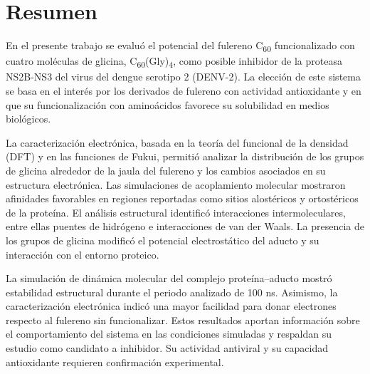 \titleformat{\chapter}[display]
  {\normalfont\bfseries}{}{0pt}{\Large}
\chapter{Resumen}
En el presente trabajo se evaluó el potencial del fulereno C\textsubscript{60} funcionalizado con cuatro moléculas de glicina, C\textsubscript{60}(Gly)\textsubscript{4}, como posible inhibidor de la proteasa NS2B-NS3 del virus del dengue serotipo 2 (DENV-2). La elección de este sistema se basa en el interés por los derivados de fulereno con actividad antioxidante y en que su funcionalización con aminoácidos favorece su solubilidad en medios biológicos.

La caracterización electrónica, basada en la teoría del funcional de la densidad (DFT) y en las funciones de Fukui, permitió analizar la distribución de los grupos de glicina alrededor de la jaula del fulereno y los cambios asociados en su estructura electrónica. Las simulaciones de acoplamiento molecular mostraron afinidades favorables en regiones reportadas como sitios alostéricos y ortostéricos de la proteína. El análisis estructural identificó interacciones intermoleculares, entre ellas puentes de hidrógeno e interacciones de van der Waals. La presencia de los grupos de glicina modificó el potencial electrostático del aducto y su interacción con el entorno proteico.

La simulación de dinámica molecular del complejo proteína--aducto mostró estabilidad estructural durante el periodo analizado de 100 ns. Asimismo, la caracterización electrónica indicó una mayor facilidad para donar electrones respecto al fulereno sin funcionalizar. Estos resultados aportan información sobre el comportamiento del sistema en las condiciones simuladas y respaldan su estudio como candidato a inhibidor. Su actividad antiviral y su capacidad antioxidante requieren confirmación experimental.

